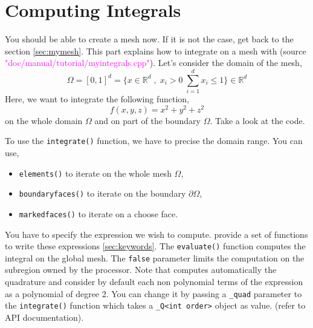 %

\section{Computing Integrals}
\label{sec:myintegrals}

You should be able to create a mesh now. If it is not the case, get back to the
section \ref{sec:mymesh}. This part explains how to integrate on a mesh with \feel
(source \textcolor{magenta}{"doc/manual/tutorial/myintegrals.cpp"}).
Let's consider the domain of the mesh,
\[
    \Omega=[0,1]^d=
    \{
        x\in\mathbb{R}^d\;,\;
        x_i>0\;
        \sum_{i=1}^d x_i \leqslant 1
    \}\in\mathbb{R}^d
\]
Here, we want to integrate the following function,
%
\begin{equation}
    f(x,y,z) = x^2 + y^2 + z^2
\end{equation}
%
on the whole domain $\Omega$ and on part of the boundary $\Omega$. Take a look at the code.
%
\vspace{2mm}

\vspace{2mm}
%
To use the \lstinline!integrate()! function, we have to precise the domain range. You can use,
\begin{itemize}
    \item \lstinline!elements()! to iterate on the whole mesh $\Omega$,
    \item \lstinline!boundaryfaces()! to iterate on the boundary $\partial\Omega$,
    \item \lstinline!markedfaces()! to iterate on a choose face.
\end{itemize}
%
You have to specify the expression we wish to compute. \feel provide a set of functions
to write these expressions \ref{sec:keywords}.
The \lstinline!evaluate()! function computes the integral on the global mesh.
The \lstinline!false! parameter limits the computation on the subregion owned by
the processor.
%
Note that \feel computes automatically the quadrature and consider by default each
non polynomial terms of the expression as a polynomial of degree 2. You can change
it by passing a \lstinline!_quad! parameter to the \lstinline!integrate()! function 
which takes a \lstinline!_Q<int order>! object as value.
(refer to API documentation).




